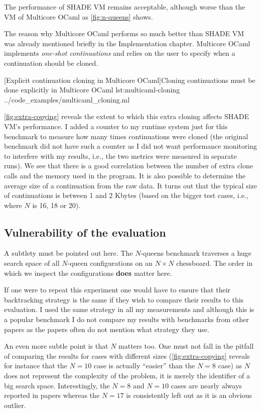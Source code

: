 \documentclass[class=article, crop=false]{standalone}
\begin{document}
The performance of SHADE VM remains acceptable, although worse than the VM of
Multicore OCaml as \autoref{fig:n-queens} shows.

The reason why Multicore OCaml performs so much better than SHADE VM was
already mentioned briefly in the Implementation chapter. Multicore OCaml implements
\emph{one-shot continuations} and relies on the user to specify when a continuation
should be cloned.

{[Explicit continuation cloning in Multicore OCaml]Cloning continuations must be done explicitly in Multicore OCaml}
{lst:multicaml-cloning}
{../code_examples/multicaml_cloning.ml}

\autoref{fig:extra-copying} reveals the extent to which this extra cloning
affects SHADE VM's performance. I added a counter to my runtime system just for
this benchmark to measure how many times continuations were cloned (the original
benchmark did not have such a counter as I did not want performance monitoring
to interfere with my results, i.e., the two metrics were measured in separate
runs). We see that there is a good correlation between the number of extra
clone calls and the memory used in the program. It is also possible to determine
the average size of a continuation from the raw data. It turns out that the typical
size of continuations is between 1 and 2 Kbytes (based on the bigger test cases, i.e.,
where $N$ is 16, 18 or 20).

\subsection{Vulnerability of the evaluation}

A subtlety must be pointed out here. The $N$-queens benchmark traverses a huge
search space of all $N$-queen configurations on an $N\times N$ chessboard. The
order in which we inspect the configurations \textbf{does} matter here.

If one were to repeat this experiment one would have to ensure that their
backtracking strategy is the same if they wish to compare their results to this
evaluation. I used the same strategy in all my measurements and although this is
a popular benchmark I do not compare my results with benchmarks from other papers
as the papers often do not mention what strategy they use.

An even more subtle point is that $N$ matters too. One must not fall in the pitfall
of comparing the results for cases with different sizes (\autoref{fig:extra-copying}
reveals for instance that the $N=10$ case is actually ``easier'' than the $N=8$
case) as $N$ does not represent the complexity of the problem, it is merely the
identifier of a big search space. Interestingly, the $N=8$ and $N=10$ cases are
nearly always reported in papers whereas the $N=17$ is consistently left out as
it is an obvious outlier.
\end{document}
